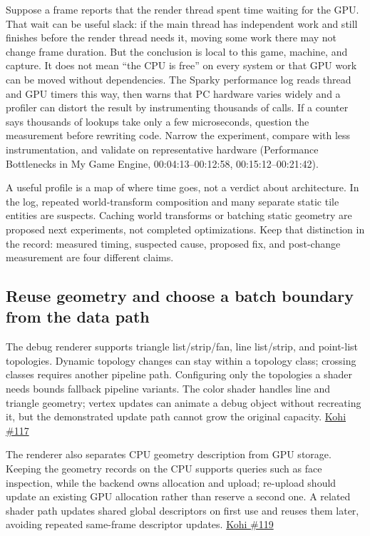 Suppose a frame reports that the render thread spent time waiting for the GPU. That wait can be useful slack: if the main thread has independent work and still finishes before the render thread needs it, moving some work there may not change frame duration. But the conclusion is local to this game, machine, and capture. It does not mean ``the CPU is free'' on every system or that GPU work can be moved without dependencies. The Sparky performance log reads thread and GPU timers this way, then warns that PC hardware varies widely and a profiler can distort the result by instrumenting thousands of calls. If a counter says thousands of lookups take only a few microseconds, question the measurement before rewriting code. Narrow the experiment, compare with less instrumentation, and validate on representative hardware (Performance Bottlenecks in My Game Engine, 00:04:13--00:12:58, 00:15:12--00:21:42).

A useful profile is a map of where time goes, not a verdict about architecture. In the log, repeated world-transform composition and many separate static tile entities are suspects. Caching world transforms or batching static geometry are proposed next experiments, not completed optimizations. Keep that distinction in the record: measured timing, suspected cause, proposed fix, and post-change measurement are four different claims.

\subsection{Reuse geometry and choose a batch boundary from the data path}\label{06-engine-ii-ch026-reuse-geometry-and-choose-a-batch-boundary-from-the-data-path}

The debug renderer supports triangle list/strip/fan, line list/strip, and point-list topologies. Dynamic topology changes can stay within a topology class; crossing classes requires another pipeline path. Configuring only the topologies a shader needs bounds fallback pipeline variants. The color shader handles line and triangle geometry; vertex updates can animate a debug object without recreating it, but the demonstrated update path cannot grow the original capacity. \href{https://www.youtube.com/watch?v=FYpNGvexM0g}{Kohi \#117}

The renderer also separates CPU geometry description from GPU storage. Keeping the geometry records on the CPU supports queries such as face inspection, while the backend owns allocation and upload; re-upload should update an existing GPU allocation rather than reserve a second one. A related shader path updates shared global descriptors on first use and reuses them later, avoiding repeated same-frame descriptor updates. \href{https://www.youtube.com/watch?v=pPWshwZB7eo}{Kohi \#119}

